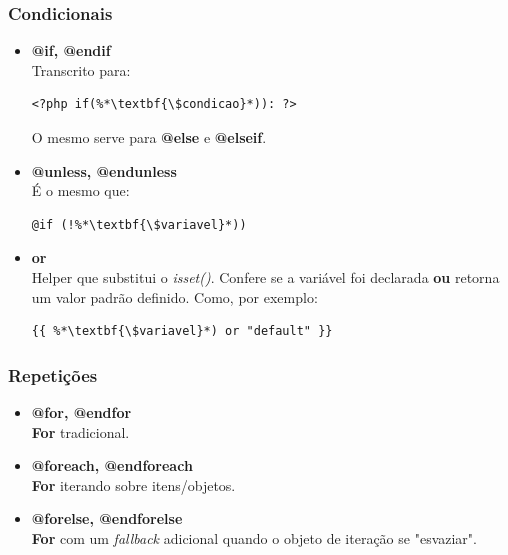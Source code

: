 \documentclass[
12pt,				%
openany,			%
twoside,			%
a4paper,			%
english,			%
french,				%
spanish,			%
brazil,				%
]{abntex2}
\begin{document}
\subsubsection{Condicionais}
\begin{itemize}
    \item \textbf{@if, @endif} \\
        Transcrito para:

        \begin{lstlisting}[style=common,caption={Correspondente ao @if em PHP puro}]
    <?php if(%*\textbf{\$condicao}*)): ?>
\end{lstlisting}

O mesmo serve para \textbf{@else} e \textbf{@elseif}.

    \item \textbf{@unless, @endunless} \\

        É o mesmo que:

        \begin{lstlisting}[style=common,caption={Variação do @if}]
    @if (!%*\textbf{\$variavel}*))
\end{lstlisting}

    \item \textbf{or} \\
        Helper que substitui o \textit{isset()}. Confere se a variável foi declarada \textbf{ou} retorna um valor padrão definido. Como, por exemplo:

        \begin{lstlisting}[style=common,caption={Correspondente ao \textit{isset()} em PHP puro}]
    {{ %*\textbf{\$variavel}*) or "default" }}
\end{lstlisting}

\end{itemize}

\subsubsection{Repetições}
\begin{itemize}
    \item \textbf{@for, @endfor} \\
        \textbf{For} tradicional.

    \item \textbf{@foreach, @endforeach} \\
        \textbf{For} iterando sobre itens/objetos.

    \item \textbf{@forelse, @endforelse} \\
        \textbf{For} com um \textit{fallback} adicional quando o objeto de iteração se "esvaziar".
\end{itemize}
\end{document}
